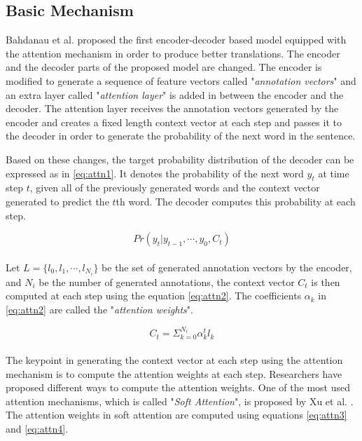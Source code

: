 \documentclass[preprint, 12pt]{elsarticle}
\begin{document}
		\subsection{Basic Mechanism}
		Bahdanau et al. \cite{bahdanau2014neural} proposed the first encoder-decoder based model equipped with the attention mechanism in order to produce better translations. The encoder and the decoder parts of the proposed model are changed. The encoder is modified to generate a sequence of feature vectors called "\textit{annotation vectors}" and an extra layer called "\textit{attention layer}" is added in between the encoder and the decoder. The attention layer receives the annotation vectors generated by the encoder and creates a fixed length context vector at each step and passes it to the decoder in order to generate the probability of the next word in the sentence.
		
		Based on these changes, the target probability distribution of the decoder can be expressed as in \eqref{eq:attn1}. It denotes the probability of the next word $y_t$ at time step $t$, given all of the previously generated words and the context vector generated to predict the $t$th word. The decoder computes this probability at each step.
		
		\begin{equation}
			Pr(y_t | y_{t-1}, \cdots, y_0 , C_t)
			\label{eq:attn1}
		\end{equation}
		\\
		Let $L = \{l_0, l_1, \cdots, l_{N_i}\}$ be the set of generated annotation vectors by the encoder, and $N_i$ be the number of generated annotations, the context vector $C_t$ is then computed at each step using the equation \eqref{eq:attn2}. The coefficients $\alpha_k$ in \eqref{eq:attn2} are called the "\textit{attention weights}".
		
		\begin{equation}
			C_t = \Sigma_{k=0}^{N_i} \alpha_k^t l_k
			\label{eq:attn2}
		\end{equation}
		\\
		The keypoint in generating the context vector at each step using the attention mechanism is to compute the attention weights at each step. Researchers have proposed different ways to compute the attention weights. One of the most used attention mechanisms, which is called "\textit{Soft Attention}", is proposed by Xu et al. \cite{xu2015show}. The attention weights in soft attention are computed using equations \eqref{eq:attn3} and \eqref{eq:attn4}.
		
\end{document}
